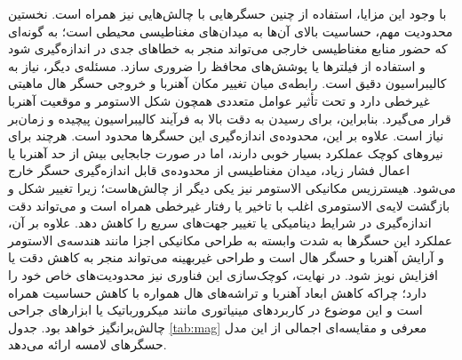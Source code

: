 با وجود این مزایا، استفاده از چنین حسگرهایی با چالش‌هایی نیز همراه است. نخستین محدودیت مهم، حساسیت بالای آن‌ها به میدان‌های مغناطیسی محیطی است؛ به گونه‌ای که حضور منابع مغناطیسی خارجی می‌تواند منجر به خطاهای جدی در اندازه‌گیری شود و استفاده از فیلترها یا پوشش‌های محافظ را ضروری سازد. مسئله‌ی دیگر، نیاز به کالیبراسیون دقیق است. رابطه‌ی میان تغییر مکان آهنربا و خروجی حسگر هال ماهیتی غیرخطی دارد و تحت تأثیر عوامل متعددی همچون شکل الاستومر و موقعیت آهنربا قرار می‌گیرد. بنابراین، برای رسیدن به دقت بالا به فرآیند کالیبراسیون پیچیده و زمان‌بر نیاز است. علاوه بر این، محدوده‌ی اندازه‌گیری این حسگرها محدود است. هرچند برای نیروهای کوچک عملکرد بسیار خوبی دارند، اما در صورت جابجایی بیش از حد آهنربا یا اعمال فشار زیاد، میدان مغناطیسی از محدوده‌ی قابل اندازه‌گیری حسگر خارج می‌شود. هیسترزیس مکانیکی الاستومر نیز یکی دیگر از چالش‌هاست؛ زیرا تغییر شکل و بازگشت لایه‌ی الاستومری اغلب با تاخیر یا رفتار غیرخطی همراه است و می‌تواند دقت اندازه‌گیری در شرایط دینامیکی یا تغییر جهت‌های سریع را کاهش دهد. علاوه بر آن، عملکرد این حسگرها به شدت وابسته به طراحی مکانیکی اجزا مانند هندسه‌ی الاستومر و آرایش آهنربا و حسگر هال است و طراحی غیربهینه می‌تواند منجر به کاهش دقت یا افزایش نویز شود. در نهایت، کوچک‌سازی این فناوری نیز محدودیت‌های خاص خود را دارد؛ چراکه کاهش ابعاد آهنربا و تراشه‌های هال همواره با کاهش حساسیت همراه است و این موضوع در کاربردهای مینیاتوری مانند میکرو‌رباتیک یا ابزارهای جراحی چالش‌برانگیز خواهد بود. جدول \ref{tab:mag} معرفی و مقایسه‌ای اجمالی از این مدل حسگرهای لامسه ارائه می‌دهد. 

